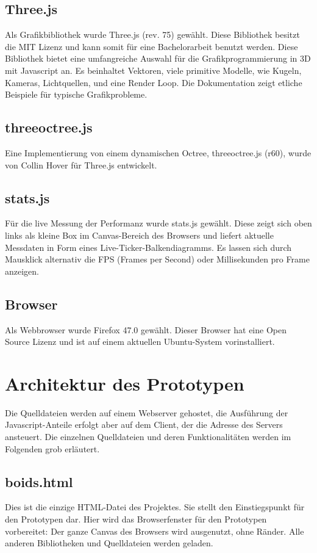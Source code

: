 \documentclass[draft=false
              ,paper=a4
              ,twoside=false
              ,fontsize=11pt
              ,headsepline
              ,BCOR10mm
              ,DIV11
              ,bibtotoc
              ,liststotoc
              ]{scrbook}
\begin{document}
\subsection{Three.js}
Als Grafikbibliothek wurde Three.js (rev. 75) gewählt. Diese Bibliothek besitzt die MIT Lizenz und kann somit für eine Bachelorarbeit benutzt werden. Diese Bibliothek bietet eine umfangreiche Auswahl für die Grafikprogrammierung in 3D mit Javascript an. Es beinhaltet Vektoren, viele primitive Modelle, wie Kugeln, Kameras, Lichtquellen, und eine Render Loop. Die Dokumentation zeigt etliche Beispiele für typische Grafikprobleme.
\subsection{threeoctree.js}
Eine Implementierung von einem dynamischen Octree, threeoctree.js (r60), wurde von Collin Hover für Three.js entwickelt.
\subsection{stats.js}
Für die live Messung der Performanz wurde stats.js gewählt. Diese zeigt sich oben links als kleine Box im Canvas-Bereich des Browsers und liefert aktuelle Messdaten in Form eines Live-Ticker-Balkendiagramms. Es lassen sich durch Mausklick alternativ die FPS (Frames per Second) oder Millisekunden pro Frame anzeigen.
\subsection{Browser}
Als Webbrowser wurde Firefox 47.0 gewählt. Dieser Browser hat eine Open Source Lizenz und ist auf einem aktuellen Ubuntu-System vorinstalliert.
\section{Architektur des Prototypen}
Die Quelldateien werden auf einem Webserver gehostet, die Ausführung der Javascript-Anteile erfolgt aber auf dem Client, der die Adresse des Servers ansteuert.
Die einzelnen Quelldateien und deren Funktionalitäten werden im Folgenden grob erläutert.
\subsection{boids.html}
Dies ist die einzige HTML-Datei des Projektes. Sie stellt den Einstiegspunkt für den Prototypen dar. Hier wird das Browserfenster für den Prototypen vorbereitet: Der ganze Canvas des Browsers wird ausgenutzt, ohne Ränder. Alle anderen Bibliotheken und Quelldateien werden geladen.
\end{document}
